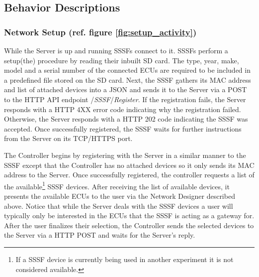 \documentclass[letterpaper,twocolumn,12pt]{article}
\begin{document}
\subsection{Behavior Descriptions}

\subsubsection{Network Setup (ref. figure \ref{fig:setup_activity})}
While the Server is up and running SSSFs connect to it. SSSFs perform a setup(the) procedure by reading their inbuilt SD card. The type, year, make, model and a serial number of the connected ECUs are required to be included in a predefined file stored on the SD card. Next, the SSSF gathers its MAC address and list of attached devices into a JSON and sends it to the Server via a POST to the HTTP API endpoint /\textit{SSSF}/\textit{Register}. 
If the registration fails, the Server responds with a HTTP 4XX error code indicating why the registration failed. Otherwise, the Server responds with a HTTP 202 code indicating the SSSF was accepted. Once successfully registered, the SSSF waits for further instructions from the Server on its TCP/HTTPS port. 

The Controller begins by registering with the Server in a similar manner to the SSSF except that the Controller has no attached devices so it only sends its MAC address to the Server.
Once successfully registered, the controller requests a list of the available{\footnote{If a SSSF device is currently being used in another experiment it is not considered available.}} SSSF devices. After receiving the list of available devices, it presents the available ECUs to the user via the Network Designer described above. Notice that while the Server deals with the SSSF devices a user will typically only be interested in the ECUs that the SSSF is acting as a gateway for. After the user finalizes their selection, the Controller sends the selected devices to the Server via a HTTP POST and waits for the Server's reply.
\end{document}
